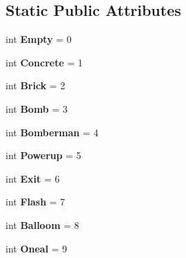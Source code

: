 \subsection*{Static Public Attributes}
\begin{DoxyCompactItemize}
\item 
\hypertarget{classsrc_1_1tile_1_1_tile_a2e2fc149a0f255ddd6a2cd64bf060e04}{}int {\bfseries Empty} = 0\label{classsrc_1_1tile_1_1_tile_a2e2fc149a0f255ddd6a2cd64bf060e04}

\item 
\hypertarget{classsrc_1_1tile_1_1_tile_a7bbfca724a7080f281ccf31fd324182d}{}int {\bfseries Concrete} = 1\label{classsrc_1_1tile_1_1_tile_a7bbfca724a7080f281ccf31fd324182d}

\item 
\hypertarget{classsrc_1_1tile_1_1_tile_ae4e13878d3a81fd1209fac1884f22569}{}int {\bfseries Brick} = 2\label{classsrc_1_1tile_1_1_tile_ae4e13878d3a81fd1209fac1884f22569}

\item 
\hypertarget{classsrc_1_1tile_1_1_tile_a22cc10d99f8785119477645d6e15f1ac}{}int {\bfseries Bomb} = 3\label{classsrc_1_1tile_1_1_tile_a22cc10d99f8785119477645d6e15f1ac}

\item 
\hypertarget{classsrc_1_1tile_1_1_tile_a44a3a6a3a1ed1c80a766b4a971a882af}{}int {\bfseries Bomberman} = 4\label{classsrc_1_1tile_1_1_tile_a44a3a6a3a1ed1c80a766b4a971a882af}

\item 
\hypertarget{classsrc_1_1tile_1_1_tile_afff8f8b451056470316105c1950c8049}{}int {\bfseries Powerup} = 5\label{classsrc_1_1tile_1_1_tile_afff8f8b451056470316105c1950c8049}

\item 
\hypertarget{classsrc_1_1tile_1_1_tile_aaa351173f66c9b5b2afe3ed6a79d68eb}{}int {\bfseries Exit} = 6\label{classsrc_1_1tile_1_1_tile_aaa351173f66c9b5b2afe3ed6a79d68eb}

\item 
\hypertarget{classsrc_1_1tile_1_1_tile_a7b37e5f805d37cd1fa30d999dd4b02cc}{}int {\bfseries Flash} = 7\label{classsrc_1_1tile_1_1_tile_a7b37e5f805d37cd1fa30d999dd4b02cc}

\item 
\hypertarget{classsrc_1_1tile_1_1_tile_a4a2cda5d4e4a662ea9ec19aebd4c75a5}{}int {\bfseries Balloom} = 8\label{classsrc_1_1tile_1_1_tile_a4a2cda5d4e4a662ea9ec19aebd4c75a5}

\item 
\hypertarget{classsrc_1_1tile_1_1_tile_a9b2b4677c74d1d30e93a235d3d997a4a}{}int {\bfseries Oneal} = 9\label{classsrc_1_1tile_1_1_tile_a9b2b4677c74d1d30e93a235d3d997a4a}


\end{DoxyCompactItemize}
